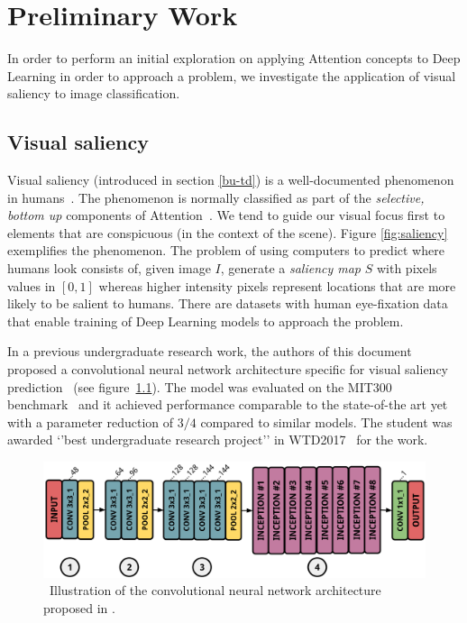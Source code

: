 \documentclass[English]{style/ic-tese-v3}
\begin{document}
\chapter{Preliminary Work}
In order to perform an initial exploration on applying Attention concepts to Deep Learning in order
to approach a problem, we investigate the application of visual saliency to image classification.

\section{Visual saliency}
Visual saliency (introduced in section \ref{bu-td}) is a well-documented phenomenon in
humans~\cite{ref:guided-search}\cite{ref:fit}.
The phenomenon is normally classified as part of the \emph{selective, bottom up} components of
Attention~\cite{ref:vocus}.
We tend to guide our visual focus first to elements that are conspicuous (in the context of the scene).
Figure \ref{fig:saliency} exemplifies the phenomenon.
The problem of using computers to predict where humans look
consists of, given image $I$, generate a \emph{saliency map} $S$ with pixels values in $[0, 1]$ whereas
higher intensity pixels represent locations that are more likely to be salient to humans.
There are datasets with human eye-fixation data~\cite{ref:salicon-dataset}
that enable training of Deep Learning models to approach the problem.

In a previous undergraduate research work, the authors of this document proposed a convolutional neural
network architecture specific for visual saliency prediction~\cite{ref:erik-esther}
(see figure~\ref{fig:deeppeek}).
The model was evaluated on the MIT300 benchmark~\cite{ref:mit-bm} and it achieved performance comparable
to the state-of-the art yet with a parameter reduction of $3/4$ compared to similar models.
The student was awarded `'best undergraduate research project''
in WTD2017~\cite{ref:wtd2017} for the work.

\begin{figure}
\begin{center}
	\includegraphics[width=0.9\linewidth]{./img/deeppeek.png}
\caption{\
    Illustration of the convolutional neural network architecture proposed in \cite{ref:erik-esther}.
}
\label{fig:deeppeek}
\end{center}
\end{figure}
\end{document}

